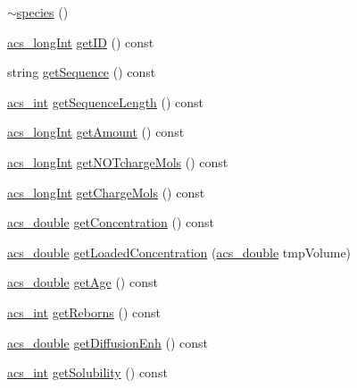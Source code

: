 \begin{DoxyCompactItemize}
\hyperlink{classspecies_a4ec3e21535ff68a06dba4e1eed935dc0}{$\sim$species} ()
\item 
\hyperlink{acs__headers_8h_a19319d75f02db4308bc5c0026d98cd85}{acs\-\_\-long\-Int} \hyperlink{classspecies_a59f2a9963c10fcb3748153c73c9c7072}{get\-I\-D} () const 
\item 
string \hyperlink{classspecies_a553019883dd1344a7f15b805453e46d1}{get\-Sequence} () const 
\item 
\hyperlink{acs__headers_8h_a8d277355641a098190360234e2ebde35}{acs\-\_\-int} \hyperlink{classspecies_ade5b59eab17c02ff322dcf068f923f9d}{get\-Sequence\-Length} () const 
\item 
\hyperlink{acs__headers_8h_a19319d75f02db4308bc5c0026d98cd85}{acs\-\_\-long\-Int} \hyperlink{classspecies_a53c74ca3861c4cdac2457e7057fbef21}{get\-Amount} () const 
\item 
\hyperlink{acs__headers_8h_a19319d75f02db4308bc5c0026d98cd85}{acs\-\_\-long\-Int} \hyperlink{classspecies_af7293ab371ab92d6d16866ea281e901a}{get\-N\-O\-Tcharge\-Mols} () const 
\item 
\hyperlink{acs__headers_8h_a19319d75f02db4308bc5c0026d98cd85}{acs\-\_\-long\-Int} \hyperlink{classspecies_a3af3e7879c333a55f189cd351f8358ef}{get\-Charge\-Mols} () const 
\item 
\hyperlink{acs__headers_8h_ab776853a005fcbf56af0424a2a4dd607}{acs\-\_\-double} \hyperlink{classspecies_a2baa5d157d49282cee8b59a2db0217b0}{get\-Concentration} () const 
\item 
\hyperlink{acs__headers_8h_ab776853a005fcbf56af0424a2a4dd607}{acs\-\_\-double} \hyperlink{classspecies_ab930176d793e5d3b8ce984013d0e0328}{get\-Loaded\-Concentration} (\hyperlink{acs__headers_8h_ab776853a005fcbf56af0424a2a4dd607}{acs\-\_\-double} tmp\-Volume)
\item 
\hyperlink{acs__headers_8h_ab776853a005fcbf56af0424a2a4dd607}{acs\-\_\-double} \hyperlink{classspecies_a209c36c4e7eda0608f14cc003c344d65}{get\-Age} () const 
\item 
\hyperlink{acs__headers_8h_a8d277355641a098190360234e2ebde35}{acs\-\_\-int} \hyperlink{classspecies_a00fe9b888d23788423cbcdc634eae934}{get\-Reborns} () const 
\item 
\hyperlink{acs__headers_8h_ab776853a005fcbf56af0424a2a4dd607}{acs\-\_\-double} \hyperlink{classspecies_ac609ed0616615f27ed1a3313efcda075}{get\-Diffusion\-Enh} () const 
\item 
\hyperlink{acs__headers_8h_a8d277355641a098190360234e2ebde35}{acs\-\_\-int} \hyperlink{classspecies_a14bde6b3114c4507c0b8018df41eaf4f}{get\-Solubility} () const 

\end{DoxyCompactItemize}
